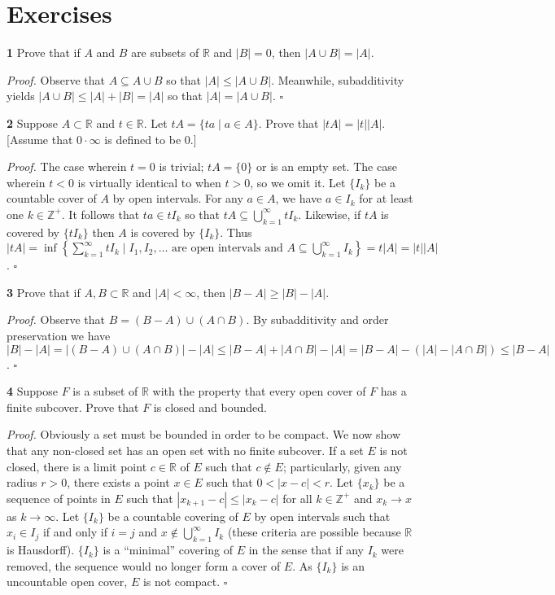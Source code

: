 \documentclass[a4paper]{article}
\newcommand{\R}{\mathbb{R}}
\newcommand{\Z}{\mathbb{Z}}
\begin{document}
\section*{Exercises}

\textbf{1} Prove that if $A$ and $B$ are subsets of $\R$ and $|B| = 0$, then $|A \cup B| = |A|$.

\emph{Proof.} Observe that $A \subseteq A \cup B$ so that $|A| \leq |A \cup B|$. Meanwhile, subadditivity yields $|A \cup B| \leq |A| + |B| = |A|$ so that $|A| = |A \cup B|$. $\square$

\textbf{2} Suppose $A \subset \R$ and $t \in \R$. Let $tA = \{ta \mid a \in A\}$. Prove that $|tA| = |t||A|$. [Assume that $0 \cdot \infty$ is defined to be $0$.]

\emph{Proof.} The case wherein $t = 0$ is trivial; $tA = \{0\}$ or is an empty set. The case wherein $t < 0$ is virtually identical to when $t > 0$, so we omit it. Let $\{I_k\}$ be a countable cover of $A$ by open intervals. For any $a \in A$, we have $a \in I_k$ for at least one $k \in \Z^+$. It follows that $ta \in tI_k$ so that $tA \subseteq \bigcup_{k=1}^\infty tI_k$. Likewise, if $tA$ is covered by $\{tI_k\}$ then $A$ is covered by $\{I_k\}$. Thus $|tA| = \inf\left\{\sum_{k=1}^\infty tI_k \mid I_1, I_2, \ldots \text{ are open intervals and } A \subseteq \bigcup_{k=1}^\infty I_k\right\} = t|A| = |t||A|$. $\square$

\textbf{3} Prove that if $A, B \subset \R$ and $|A| < \infty$, then $|B - A| \geq |B| - |A|$.

\emph{Proof.} Observe that $B = (B - A) \cup (A \cap B)$. By subadditivity and order preservation we have $|B| - |A| = |(B - A) \cup (A \cap B)| - |A| \leq |B - A| + |A \cap B| - |A| = |B - A| - (|A| - |A \cap B|) \leq |B - A|$. $\square$

\textbf{4} Suppose $F$ is a subset of $\R$ with the property that every open cover of $F$ has a finite subcover. Prove that $F$ is closed and bounded.

\emph{Proof.} Obviously a set must be bounded in order to be compact. We now show that any non-closed set has an open set with no finite subcover. If a set $E$ is not closed, there is a limit point $c \in \R$ of $E$ such that $c \notin E$; particularly, given any radius $r > 0$, there exists a point $x \in E$ such that $0 < |x - c| < r$. Let $\{x_k\}$ be a sequence of points in $E$ such that $|x_{k+1} - c| \leq |x_k - c|$ for all $k \in \Z^+$ and $x_k \to x$ as $k \to \infty$. Let $\{I_k\}$ be a countable covering of $E$ by open intervals such that $x_i \in I_j$ if and only if $i = j$ and $x \notin \bigcup_{k=1}^\infty I_k$ (these criteria are possible because $\R$ is Hausdorff). $\{I_k\}$ is a ``minimal'' covering of $E$ in the sense that if any $I_k$ were removed, the sequence would no longer form a cover of $E$. As $\{I_k\}$ is an uncountable open cover, $E$ is not compact. $\square$
\end{document}
